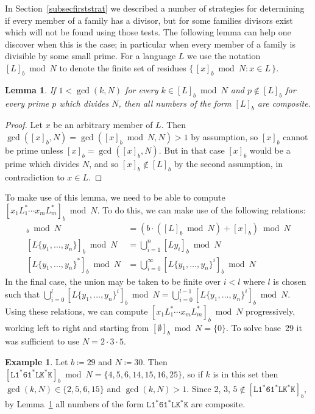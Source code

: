 \documentclass[12pt]{article}
\theoremstyle{plain}
\newtheorem{lemma}[theorem]{Lemma}
\theoremstyle{definition}
\newtheorem{example}[theorem]{Example}
\newcommand{\0}{\mathtt{0}}
\newcommand{\1}{\mathtt{1}}
\newcommand{\2}{\mathtt{2}}
\newcommand{\3}{\mathtt{3}}
\newcommand{\4}{\mathtt{4}}
\newcommand{\5}{\mathtt{5}}
\newcommand{\6}{\mathtt{6}}
\newcommand{\7}{\mathtt{7}}
\newcommand{\8}{\mathtt{8}}
\newcommand{\9}{\mathtt{9}}
\newcommand{\set}[2]{\{\,#1{}:{}#2\,\}}
\begin{document}
In Section~\ref{subsecfirststrat} we described a number of strategies for determining if every member of a family has a divisor,
but for some families divisors exist which will not be found using those tests.  The following lemma can help one discover when
this is the case; in particular when every member of a family is divisible by some small prime.  For a language $L$ we use the
notation $[L]_b\bmod N$ to denote the finite set of residues $\set{[x]_b\bmod N}{x\in L}$.
\begin{lemma}\label{lemextdiv}
If\/ $1<\gcd(k,N)$ for every\/ $k\in[L]_b\bmod N$ and\/ $p\notin[L]_b$ for every prime\/ $p$ which divides\/ $N$, then all numbers of the form\/ $[L]_b$ are composite.
\end{lemma}
\begin{proof}
Let $x$ be an arbitrary member of $L$.  Then $\gcd([x]_b,N)=\gcd([x]_b\bmod N,N)>1$ by assumption, so $[x]_b$ cannot be prime unless $[x]_b=\gcd([x]_b,N)$.  But in that case $[x]_b$ would be a prime which divides $N$, and so $[x]_b\notin[L]_b$ by the second assumption, in contradiction to $x\in L$.
\end{proof}
To make use of this lemma, we need to be able to compute $[x_1L_1^*\dotsm x_mL_m^*]_b\bmod N$.  To do this, we can make use of the following relations:
\begin{align*}
[Lx]_b \bmod N &= (b\cdot([L]_b\bmod N)+[x]_b)\bmod N \\
[L\{y_1,\dotsc,y_n\}]_b \bmod N &= \bigcup_{i=1}^n[Ly_i]_b\bmod N \\
[L\{y_1,\dotsc,y_n\}^*]_b \bmod N &= \bigcup_{i=0}^\infty[L\{y_1,\dotsc,y_n\}^i]_b\bmod N
\end{align*}
In the final case, the union may be taken to be finite over $i<l$ where $l$ is chosen such that $\bigcup_{i=0}^l[L\{y_1,\dotsc,y_n\}^i]_b\bmod N=\bigcup_{i=0}^{l-1}[L\{y_1,\dotsc,y_n\}^i]_b\bmod N$.
Using these relations, we can compute $[x_1L_1^*\dotsm x_mL_m^*]_b\bmod N$ progressively, working left to right and starting from $[\emptyset]_b\bmod N = \{0\}$.  To solve base~29 it was sufficient to use $N=2\cdot3\cdot5$.
\begin{example}
Let $b\coloneqq29$ and $N\coloneqq30$. %
Then $[\mathtt{L}\1^*\6\1^*\mathtt{LK}^*\mathtt{K}]_b\bmod N=\{4,5,6,14,15,16,25\}$, so if $k$ is in this set then $\gcd(k,N)\in\{2,5,6,15\}$ and $\gcd(k,N)>1$.  Since $2$, $3$, $5\notin[\mathtt{L}\1^*\6\1^*\mathtt{LK}^*\mathtt{K}]_b$, by Lemma~\ref{lemextdiv} all numbers of the form $\mathtt{L}\1^*\6\1^*\mathtt{LK}^*\mathtt{K}$ are composite.
\end{example}
\end{document}
